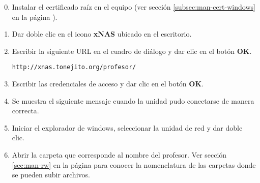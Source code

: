 {
\linespread{0.1}
\begin{enumerate}
\setcounter{enumi}{-1} %

  \item Instalar el certificado ra\'{i}z en el equipo (ver secci\'{o}n \ref{subsec:man-cert-windows} en la p\'{a}gina \pageref{subsec:man-cert-windows}).

  \item Dar doble clic en el icono \textbf{xNAS} ubicado en el escritorio.


  \item Escribir la siguiente \textsc{URL} en el cuadro de di\'{a}logo y dar clic en el bot\'{o}n \textbf{OK}.

    \texttt{http://xnas.tonejito.org/profesor/}

\newpage
  \item Escribir las credenciales de acceso y dar clic en el bot\'{o}n \textbf{OK}.


  \item Se muestra el siguiente mensaje cuando la unidad pudo conectarse de manera correcta.


  \item Iniciar el explorador de windows, seleccionar la unidad de red y dar doble clic.


  \item Abrir la carpeta que corresponde al nombre del profesor. Ver secci\'{o}n \ref{sec:man-rw} en la p\'{a}gina \pageref{sec:man-rw} para conocer la nomenclatura de las carpetas donde se pueden subir archivos.


%

\end{enumerate}
}

